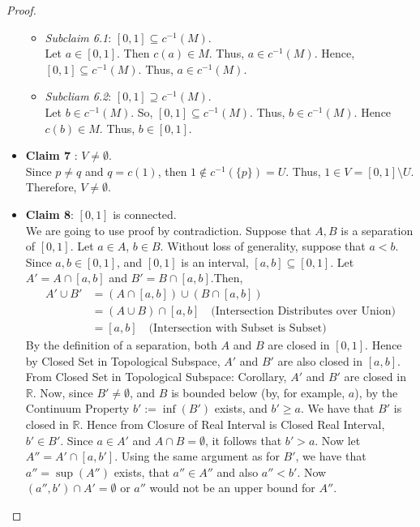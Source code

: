 \documentclass[
]{book}
\theoremstyle{definition}
\theoremstyle{definition}
\theoremstyle{definition}
\theoremstyle{definition}
\theoremstyle{remark}
\begin{document}
\begin{proof}
\begin{itemize}
  \begin{itemize}
  \item
    \emph{Subclaim 6.1}: \([0,1]\subseteq c^{-1}(M)\).\\
    Let \(a\in [0,1]\). Then \(c(a)\in M\). Thus, \(a\in c^{-1}(M)\). Hence, \([0,1]\subseteq c^{-1}(M)\). Thus, \(a\in c^{-1}(M)\).
  \item
    \emph{Subcliam 6.2}: \([0,1]\supseteq c^{-1}(M)\).\\
    Let \(b\in c^{-1}(M)\). So, \([0,1]\subseteq c^{-1}(M)\). Thus, \(b\in c^{-1}(M)\). Hence \(c(b)\in M\). Thus, \(b\in [0,1]\).
  \end{itemize}
\item
  \textbf{Claim 7} : \(V\neq \emptyset\).\\
  Since \(p\neq q\) and \(q=c(1)\), then \(1\not\in c^{-1}(\{p\})=U\). Thus, \(1\in V=[0,1]\setminus U\). Therefore, \(V\neq \emptyset\).
\item
  \textbf{Claim 8}: \([0,1]\) is connected.\\
  We are going to use proof by contradiction.
  Suppose that \(A,B\) is a separation of \([0,1]\).
  Let \(a \in A\), \(b \in B\).
  Without loss of generality, suppose that \(a < b\).
  Since \(a, b \in [0,1]\), and \([0,1]\) is an interval, \([a,b] \subseteq [0,1]\). Let \(A' = A \cap [a,b]\) and \(B' = B \cap [a,b]\).Then,
  \begin{align*}
  A' \cup B' &= (A \cap [a,b]) \cup (B \cap [a,b]) \\
  &= (A \cup B) \cap [a,b] \quad \text{(Intersection Distributes over Union)} \\
  &= [a,b] \quad \text{(Intersection with Subset is Subset)}
  \end{align*}
  By the definition of a separation, both \(A\) and \(B\) are closed in \([0,1]\).
  Hence by Closed Set in Topological Subspace, \(A'\) and \(B'\) are also closed in \([a,b]\).
  From Closed Set in Topological Subspace: Corollary, \(A'\) and \(B'\) are closed in \(\mathbb{R}\).
  Now, since \(B' \neq \emptyset\), and \(B\) is bounded below (by, for example, \(a\)), by the Continuum Property \(b' := \inf(B')\) exists, and \(b' \geq a\).
  We have that \(B'\) is closed in \(\mathbb{R}\).
  Hence from Closure of Real Interval is Closed Real Interval, \(b' \in B'\).
  Since \(a \in A'\) and \(A \cap B = \emptyset\), it follows that \(b' > a\).
  Now let \(A'' = A' \cap [a,b']\).
  Using the same argument as for \(B'\), we have that \(a'' = \sup(A'')\) exists, that \(a'' \in A''\) and also \(a'' < b'\).
  Now \((a'',b') \cap A' = \emptyset\) or \(a''\) would not be an upper bound for \(A''\).

\end{itemize}
\end{proof}
\end{document}
